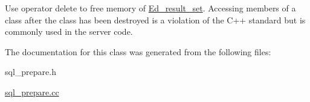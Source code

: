 Use operator delete to free memory of \mbox{\hyperlink{classEd__result__set}{Ed\+\_\+result\+\_\+set}}. Accessing members of a class after the class has been destroyed is a violation of the C++ standard but is commonly used in the server code. 

The documentation for this class was generated from the following files\+:\begin{DoxyCompactItemize}
\item 
sql\+\_\+prepare.\+h\item 
\mbox{\hyperlink{sql__prepare_8cc}{sql\+\_\+prepare.\+cc}}\end{DoxyCompactItemize}
